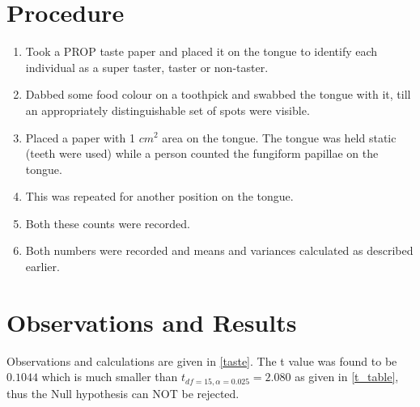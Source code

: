\section{Procedure}
	\begin{enumerate}
		\item Took a PROP taste paper and placed it on the tongue to identify each individual as a super taster, taster or non-taster.
		\item Dabbed some food colour on a toothpick and swabbed the tongue with it, till an appropriately distinguishable set of spots were visible. 
		\item Placed a paper with 1 $cm^2$ area on the tongue. The tongue was held static (teeth were used) while a person counted the fungiform papillae on the tongue.
		\item This was repeated for another position on the tongue. 
		\item Both these counts were recorded.
		\item Both numbers were recorded and means and variances calculated as described earlier.
	\end{enumerate}

\section{Observations and Results}
	Observations and calculations are given in \autoref{taste}. The t value was found to be $0.1044$ which is much smaller than $t_{df=15, \alpha=0.025}=2.080$ as given in \autoref{t_table}, thus the Null hypothesis can NOT be rejected.

